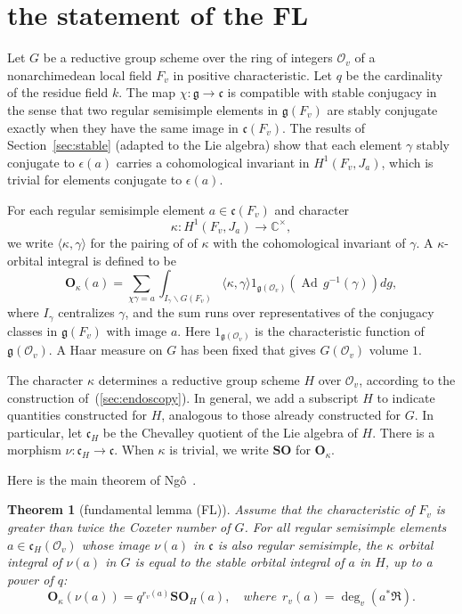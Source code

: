\documentclass[brochure,english,12pt]{bourbaki}
\theoremstyle{plain}
\newtheorem{theorem}[equation]{Theorem}
\def\op#1{{\operatorname{#1}}}
\newcommand{\ring}[1]{\mathbb{#1}}
\def\SO{{\mathbf {SO}}}
\def\OO{{\mathbf O}}
\def\g{\mathfrak{g}}
\def\cc{\mathfrak{c}}
\def\RDIV{{\mathfrak{R}}}
\def\O{{\mathcal O}}
\begin{document}
\section{the statement of the FL}\label{sec:statement}

Let $G$ be a reductive group scheme over the ring of integers $\O_v$ of
a nonarchimedean local field $F_v$ in positive characteristic.  Let $q$ be the cardinality
of the residue field $k$.  The map $\chi:\g\to\cc$
is compatible with stable conjugacy in the sense that two
regular semisimple elements in $\g(F_v)$ are stably conjugate exactly
when they have the same image in $\cc(F_v)$.    The results of
Section~\ref{sec:stable} (adapted to the Lie algebra)
show that each element $\gamma$ stably conjugate to
$\epsilon(a)$ carries a cohomological invariant in $H^1(F_v,J_a)$, which is trivial for
elements conjugate to $\epsilon(a)$. 

For each regular semisimple element $a\in \cc(F_v)$ and character 
\[
\kappa:H^1(F_v,J_a)\to\ring{C}^\times,
\]
we write
 $\langle\kappa,\gamma\rangle$ for the pairing of
of $\kappa$ with the cohomological invariant of $\gamma$.
A 
$\kappa$-orbital integral is defined to be
\begin{equation}\label{eqn:k-orbital}
\OO_\kappa(a) = \sum_ {\chi\gamma= a} 
\int_{I_\gamma\backslash G(F_v)} \langle\kappa,\gamma\rangle 
1_{\g(\O_v)} (\op{Ad}\, g^{-1}(\gamma)) dg,
\end{equation}
where $I_\gamma$ centralizes $\gamma$, and the sum runs over
representatives of the conjugacy classes in $\g(F_v)$ with image $a$.
Here $1_{\g(\O_v)}$ is the characteristic function of $\g(\O_v)$.  A
Haar measure on $G$ has been fixed that gives $G(\O_v)$ volume $1$.


The character $\kappa$ determines a reductive group scheme $H$ over
$\O_v$, according to the construction of~(\ref{sec:endoscopy}).
In general, we add
a subscript $H$ to indicate quantities constructed for $H$, analogous
to those already constructed for $G$.  In particular,
let $\cc_H$ be the Chevalley quotient of the Lie algebra of $H$. There is
a morphism $\nu:\cc_H\to\cc$.    When $\kappa$ is trivial, we
write $\SO$ for $\OO_\kappa$.

Here is the main theorem of Ng\^o~\cite{NBC:2010}.

\begin{theorem}[fundamental lemma (FL)]
  Assume that the characteristic of $F_v$ is greater than twice the
  Coxeter number of $G$.  For all regular semisimple elements $a\in
  \cc_H(\O_v)$ whose image $\nu(a)$ in $\cc$ is also regular
  semisimple, the $\kappa$ orbital integral of $\nu(a)$ in $G$ is
  equal to the stable orbital integral of $a$ in $H$, up to a power of
  $q$:
\[
\OO_\kappa(\nu(a)) = q^{r_v(a)}\SO_H(a),\quad{ where~~ } r_v(a) = \deg_v(a^*\RDIV).
\]
\end{theorem}
\end{document}
